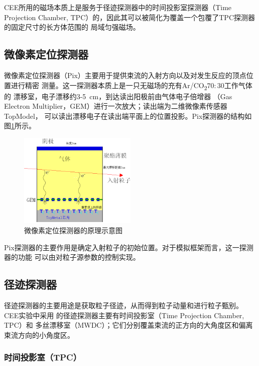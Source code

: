 \documentclass[bachelor,openany,oneside,color]{buaathesis}
\begin{document}
CEE所用的磁场本质上是服务于径迹探测器中的时间投影室探测器（Time Projection Chamber,
TPC）的，因此其可以被简化为覆盖一个包覆了TPC探测器的固定尺寸的长方体范围的
局域匀强磁场。

\subsection{微像素定位探测器}\label{ssec:det:track}

微像素定位探测器（Pix）主要用于提供束流的入射方向以及对发生反应的顶点位置进行精密
测量。这一探测器本质上是一只无磁场的充有Ar/CO\textsubscript{2}$70:30$工作气体的
漂移室，电子漂移约3-\SI{5}{\centi\meter}，到达读出阳极前由气体电子倍增器
（Gas Electron Multiplier，GEM）进行一次放大；读出端为二维微像素传感器TopModel，
可以读出漂移电子在读出端平面上的位置投影。Pix探测器的结构如图\ref{fig:det:Pix}所示。

\begin{figure}
	\centering
	\includegraphics[width=0.5\textwidth]{./resource/CEE-Pix.png}
	\caption{微像素定位探测器的原理示意图\cite{Lyu:ConceptDesign}}
	\label{fig:det:Pix}
\end{figure}

Pix探测器的主要作用是确定入射粒子的初始位置。对于模拟框架而言，这一探测器的功能
可以由对粒子源参数的控制实现。

\subsection{径迹探测器}

径迹探测器的主要用途是获取粒子径迹，从而得到粒子动量和进行粒子甄别。CEE实验中采用
的径迹探测器主要有时间投影室（Time Projection Chamber, TPC）和
多丝漂移室（MWDC）；它们分别覆盖束流的正方向的大角度区和偏离束流方向的小角度区。

\subsubsection{时间投影室（TPC）}
\end{document}
